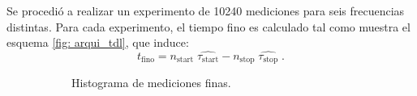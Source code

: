 Se procedió a realizar un experimento de 10240 mediciones para seis frecuencias distintas.
Para cada experimento, el tiempo fino es calculado tal como muestra el esquema \ref{fig: arqui_tdl}, que induce:
\begin{equation}
     t_\text{fino} = n_\text{start} \; \hat{\tau_\text{start}} - n_\text{stop} \; \hat{\tau_\text{stop}} \; .
     \label{eq: t_fino}
\end{equation}
\begin{figure}[H]
     \centering
     \begin{subfigure}[t]{0.45\textwidth} %
           \centering
           \caption{Histograma de mediciones finas.}
           \label{fig: histograma_66}
     \end{subfigure}%
     \hspace{10pt}%
     \begin{subfigure}[t]{0.45\textwidth} %
           \centering
\end{subfigure}
\end{figure}
